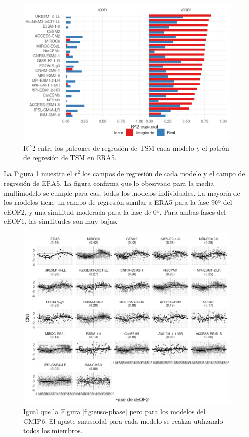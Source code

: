 \documentclass[12pt,oneside,a4paper]{reedthesis}
\begin{document}
\begin{figure}

{\centering \includegraphics{figures/50-cmip6/cor-sst-regr-1} 

}

\caption{R\^{}2 entre los patrones de regresión de TSM cada modelo y el patrón de regresión de TSM en ERA5.}\label{fig:cor-sst-regr}
\end{figure}

La Figura \ref{fig:cor-sst-regr} muestra el \(r^2\) los campos de regresión de cada modelo y el campo de regresión de ERA5.
La figura confirma que lo observado para la media multimodelo se cumple para casi todos los modelos individuales.
La mayoría de los modelos tiene un campo de regresión similar a ERA5 para la fase 90º del cEOF2, y una similitud moderada para la fase de 0º.
Para ambas fases del cEOF1, las similitudes son muy bajas.

\begin{figure}

{\centering \includegraphics{figures/50-cmip6/enso-phase-cmip-1} 

}

\caption{Igual que la Figura \ref{fig:enso-phase} pero para los modelos del CMIP6. El ajuste sinusoidal para cada modelo se realiza utilizando todos los miembros.}\label{fig:enso-phase-cmip}
\end{figure}
\end{document}
